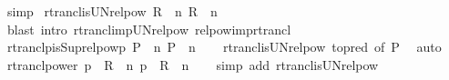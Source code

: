 \begin{isabellebody}
\ simp%
\endisatagproof
{\isafoldproof}%
%
\isadelimproof
\isanewline
%
\endisadelimproof
\isanewline
{}\isamarkupfalse%
\ rtrancl{\isacharunderscore}{\kern0pt}is{\isacharunderscore}{\kern0pt}UN{\isacharunderscore}{\kern0pt}relpow{\isacharcolon}{\kern0pt}\ {\isachardoublequoteopen}R\isactrlsup {\isacharasterisk}{\kern0pt}\ {\isacharequal}{\kern0pt}\ {\isacharparenleft}{\kern0pt}{\isasymUnion}n{\isachardot}{\kern0pt}\ R\ {\isacharcircum}{\kern0pt}{\isacharcircum}{\kern0pt}\ n{\isacharparenright}{\kern0pt}{\isachardoublequoteclose}\isanewline
%
\isadelimproof
\ \ %
\endisadelimproof
%
\isatagproof
{}\isamarkupfalse%
\ {\isacharparenleft}{\kern0pt}blast\ intro{\isacharcolon}{\kern0pt}\ rtrancl{\isacharunderscore}{\kern0pt}imp{\isacharunderscore}{\kern0pt}UN{\isacharunderscore}{\kern0pt}relpow\ relpow{\isacharunderscore}{\kern0pt}imp{\isacharunderscore}{\kern0pt}rtrancl{\isacharparenright}{\kern0pt}%
\endisatagproof
{\isafoldproof}%
%
\isadelimproof
\isanewline
%
\endisadelimproof
\isanewline
{}\isamarkupfalse%
\ rtranclp{\isacharunderscore}{\kern0pt}is{\isacharunderscore}{\kern0pt}Sup{\isacharunderscore}{\kern0pt}relpowp{\isacharcolon}{\kern0pt}\ {\isachardoublequoteopen}P\isactrlsup {\isacharasterisk}{\kern0pt}\isactrlsup {\isacharasterisk}{\kern0pt}\ {\isacharequal}{\kern0pt}\ {\isacharparenleft}{\kern0pt}{\isasymSqunion}n{\isachardot}{\kern0pt}\ P\ {\isacharcircum}{\kern0pt}{\isacharcircum}{\kern0pt}\ n{\isacharparenright}{\kern0pt}{\isachardoublequoteclose}\isanewline
%
\isadelimproof
\ \ %
\endisadelimproof
%
\isatagproof
{}\isamarkupfalse%
\ rtrancl{\isacharunderscore}{\kern0pt}is{\isacharunderscore}{\kern0pt}UN{\isacharunderscore}{\kern0pt}relpow\ {\isacharbrackleft}{\kern0pt}to{\isacharunderscore}{\kern0pt}pred{\isacharcomma}{\kern0pt}\ of\ P{\isacharbrackright}{\kern0pt}\ \isamarkupfalse%
\ auto%
\endisatagproof
{\isafoldproof}%
%
\isadelimproof
\isanewline
%
\endisadelimproof
\isanewline
{}\isamarkupfalse%
\ rtrancl{\isacharunderscore}{\kern0pt}power{\isacharcolon}{\kern0pt}\ {\isachardoublequoteopen}p\ {\isasymin}\ R\isactrlsup {\isacharasterisk}{\kern0pt}\ {\isasymlongleftrightarrow}\ {\isacharparenleft}{\kern0pt}{\isasymexists}n{\isachardot}{\kern0pt}\ p\ {\isasymin}\ R\ {\isacharcircum}{\kern0pt}{\isacharcircum}{\kern0pt}\ n{\isacharparenright}{\kern0pt}{\isachardoublequoteclose}\isanewline
%
\isadelimproof
\ \ %
\endisadelimproof
%
\isatagproof
{}\isamarkupfalse%
\ {\isacharparenleft}{\kern0pt}simp\ add{\isacharcolon}{\kern0pt}\ rtrancl{\isacharunderscore}{\kern0pt}is{\isacharunderscore}{\kern0pt}UN{\isacharunderscore}{\kern0pt}relpow{\isacharparenright}{\kern0pt}%

\end{isabellebody}

